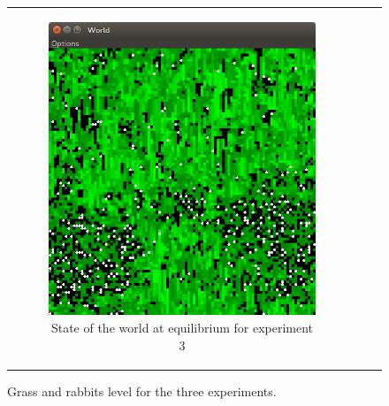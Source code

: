 \documentclass[11pt]{article}
\begin{document}
\begin{figure}
\begin{tabular}{c c c}
\begin{subfigure}[b]{0.3\textwidth}
        \includegraphics[width=\textwidth]{experiment/4/Space.png}
        \caption{\label{img:world3} State of the world at equilibrium for experiment 3}
    \end{subfigure}
   
    \end{tabular}
  \caption{Grass and rabbits level for the three experiments.}
\end{figure}
\end{document}
